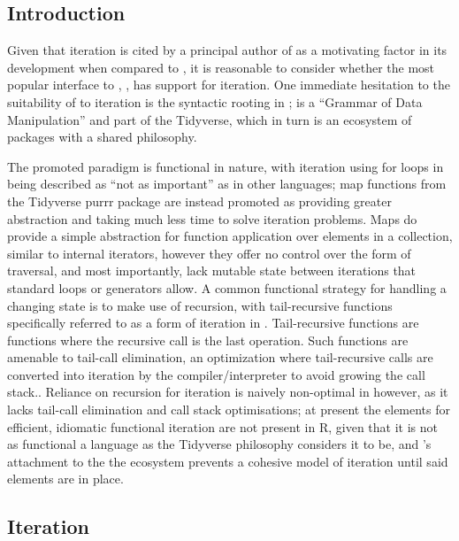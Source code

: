 \subsection{Introduction}\label{subsec:sparklyr-introduction}

Given that iteration is cited by a principal author of  as a motivating factor in its development when compared to , it is reasonable to consider whether the most popular \R{} interface to , , has support for iteration\cites{zaharia2010spark,luraschi20}.
One immediate hesitation to the suitability of  to iteration is the syntactic rooting in ;  is a ``Grammar of Data Manipulation'' and part of the Tidyverse, which in turn is an ecosystem of packages with a shared philosophy\cite{wickham2019welcome}\cite{wickham2016r}.

The promoted paradigm is functional in nature, with iteration using for loops in \R{} being described as ``not as important'' as in other languages; map functions from the Tidyverse purrr package are instead promoted as providing greater abstraction and taking much less time to solve iteration problems.
Maps do provide a simple abstraction for function application over elements in a collection, similar to internal iterators, however they offer no control over the form of traversal, and most importantly, lack mutable state between iterations that standard loops or generators allow\cite{cousineau1998functional}.
A common functional strategy for handling a changing state is to make use of recursion, with tail-recursive functions specifically referred to as a form of iteration in \cite{abelson1996sicp}.
Tail-recursive functions are functions where the recursive call is the last operation.
Such functions are amenable to tail-call elimination, an optimization where tail-recursive calls are converted into iteration by the compiler/interpreter to avoid growing the call stack..
Reliance on recursion for iteration is naively non-optimal in \R{} however, as it lacks tail-call elimination and call stack optimisations\cite{rcore2020lang}; at present the elements for efficient, idiomatic functional iteration are not present in R, given that it is not as functional a language as the Tidyverse philosophy considers it to be, and 's attachment to the the ecosystem prevents a cohesive model of iteration until said elements are in place.

\subsection{Iteration}\label{iteration}

